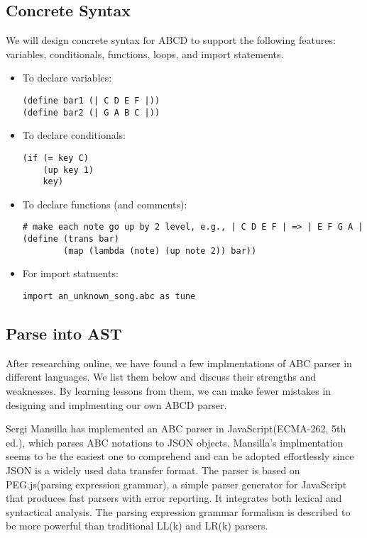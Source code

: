 \subsection{Concrete Syntax}

We will design concrete syntax for ABCD to support the following features: variables, conditionals, functions, loops, and import statements.

\begin{itemize}
\item To declare variables:
\begin{verbatim}
(define bar1 (| C D E F |))
(define bar2 (| G A B C |))
\end{verbatim}

\item To declare conditionals:
\begin{verbatim}
(if (= key C)
    (up key 1)
    key)
\end{verbatim}

\item To declare functions (and comments):
\begin{verbatim}
# make each note go up by 2 level, e.g., | C D E F | => | E F G A |
(define (trans bar)
        (map (lambda (note) (up note 2)) bar))
\end{verbatim}

\item For import statments:
\begin{verbatim}
import an_unknown_song.abc as tune
\end{verbatim}
\end{itemize}

\subsection{Parse into AST}

After researching online, we have found a few implmentations of ABC parser in different languages. We list them below and discuss their strengths and weaknesses. By learning lessons from them, we can make fewer mistakes in designing and implmenting our own ABCD parser.

Sergi Mansilla has implemented an ABC parser in JavaScript(ECMA-262, 5th ed.), which parses ABC notations to JSON objects\cite{Mansilla12}. Mansilla's implmentation seems to be the easiest one to comprehend and can be adopted effortlessly since JSON is a widely used data transfer format. The parser is based on PEG.js(parsing expression grammar), a simple parser generator for JavaScript that produces fast parsers with error reporting\cite{Ryuu17}. It integrates both lexical and syntactical analysis. The parsing expression grammar formalism is described to be more powerful than traditional LL(k) and LR(k) parsers.


